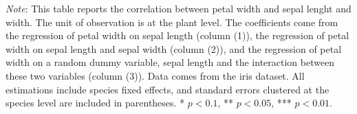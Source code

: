 \footnotesize 
\begin{justify} 
\emph{Note}: This table reports the correlation between petal width and sepal lenght and width. The unit of observation is at the plant level. The coefficients come from the regression of petal width on sepal length (column (1)), the regression of petal width on sepal length and sepal width (column (2)), and the regression of petal width on a random dummy variable, sepal length and the interaction between these two variables (column (3)). Data comes from the iris dataset. All estimations include species fixed effects, and standard errors clustered at the species level are included in parentheses. * $p < 0.1$, ** $p < 0.05$, *** $p < 0.01$.
\end{justify} 
\normalsize 

